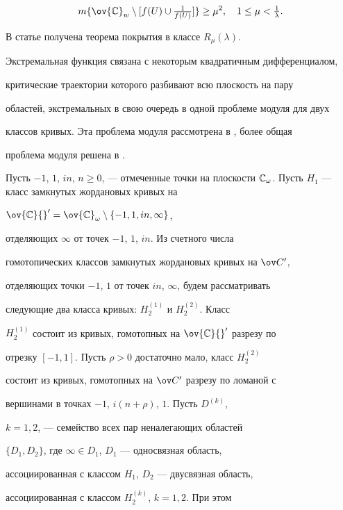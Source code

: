 $$ 


m\{\ov{\Bbb C}_w\setminus[f(U)\cup\tfrac{1}{f(U)}]\}\ge\mu^2, 


\quad1\le\mu<\tfrac{1}{\lambda}. 


$$ 


 


В статье получена теорема покрытия в классе $R_\mu(\lambda)$. 


Экстремальная функция связана с некоторым квадратичным дифференциалом, 


критические траектории которого разбивают всю плоскость на пару 


областей, экстремальных в свою очередь в одной проблеме модуля для двух 


классов кривых. Эта проблема модуля рассмотрена в \cite{3}, более общая 


проблема модуля решена в \cite{6}. 


 


Пусть $-1$, $1$, $in$, $n\ge0$, --- отмеченные точки на плоскости $\Bbb 


C_\omega$. Пусть $H_1$ --- класс замкнутых жордановых кривых на 


$\ov{\Bbb C}{}'=\ov{\Bbb C}_\omega\setminus\{-1,1,in,\infty\}$, 


отделяющих $\infty$ от точек $-1$, $1$, $in$. Из счетного числа 


гомотопических классов замкнутых жордановых кривых на $\ov C{}'$, 


отделяющих точки $-1$, $1$ от точек $in$, $\infty$, будем рассматривать 


следующие два класса кривых: $H^{(1)}_2$ и $H^{(2)}_2$. Класс 


$H^{(1)}_2$ состоит из кривых, гомотопных на $\ov{\Bbb C}{}'$ разрезу по 


отрезку $[-1,1]$. Пусть $\rho>0$ достаточно мало, класс $H^{(2)}_2$ 


состоит из кривых, гомотопных на $\ov C{}'$ разрезу по ломаной с 


вершинами в точках $-1$, $i(n+\rho)$, $1$. Пусть $D^{(k)}$, 


$k=1,2$, --- семейство всех пар неналегающих областей 


$\{D_1,D_2\}$, где $\infty\in D_1$, $D_1$ --- односвязная область, 


ассоциированная с классом $H_1$, $D_2$ --- двусвязная область, 


ассоциированная с классом $H^{(k)}_2$, $k=1,2$. При этом 


